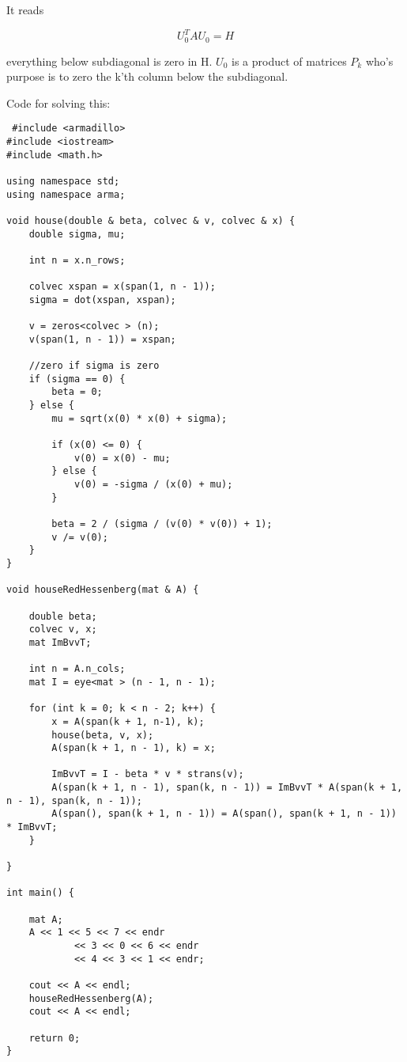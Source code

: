 \documentclass[a4paper,10pt]{article}
\begin{document}
It reads

$$U_0^TAU_0 = H$$

everything below subdiagonal is zero in H. $U_0$ is a product of matrices $P_k$ who's purpose is to zero the k'th column below the subdiagonal.

Code for solving this:

\begin{verbatim}
 #include <armadillo>
#include <iostream>
#include <math.h>

using namespace std;
using namespace arma;

void house(double & beta, colvec & v, colvec & x) {
    double sigma, mu;

    int n = x.n_rows;

    colvec xspan = x(span(1, n - 1));
    sigma = dot(xspan, xspan);

    v = zeros<colvec > (n);
    v(span(1, n - 1)) = xspan;

    //zero if sigma is zero
    if (sigma == 0) {
        beta = 0;
    } else {
        mu = sqrt(x(0) * x(0) + sigma);

        if (x(0) <= 0) {
            v(0) = x(0) - mu;
        } else {
            v(0) = -sigma / (x(0) + mu);
        }

        beta = 2 / (sigma / (v(0) * v(0)) + 1);
        v /= v(0);
    }
}

void houseRedHessenberg(mat & A) {

    double beta;
    colvec v, x;
    mat ImBvvT;

    int n = A.n_cols;
    mat I = eye<mat > (n - 1, n - 1);

    for (int k = 0; k < n - 2; k++) {
        x = A(span(k + 1, n-1), k);
        house(beta, v, x);
        A(span(k + 1, n - 1), k) = x;

        ImBvvT = I - beta * v * strans(v);
        A(span(k + 1, n - 1), span(k, n - 1)) = ImBvvT * A(span(k + 1, n - 1), span(k, n - 1));
        A(span(), span(k + 1, n - 1)) = A(span(), span(k + 1, n - 1)) * ImBvvT;
    }

}

int main() {

    mat A;
    A << 1 << 5 << 7 << endr
            << 3 << 0 << 6 << endr
            << 4 << 3 << 1 << endr;

    cout << A << endl;
    houseRedHessenberg(A);
    cout << A << endl;

    return 0;
}
\end{verbatim}
\end{document}
